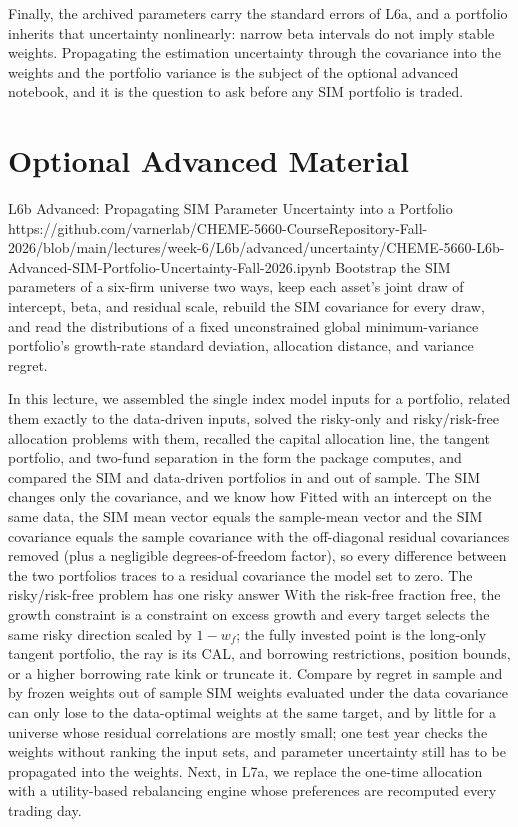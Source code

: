 \documentclass[11pt]{article}
\begin{document}
Finally, the archived parameters carry the standard errors of L6a, and a portfolio inherits that uncertainty nonlinearly: narrow beta intervals do not imply stable weights. Propagating the estimation uncertainty through the covariance into the weights and the portfolio variance is the subject of the optional advanced notebook, and it is the question to ask before any SIM portfolio is traded.

\section*{Optional Advanced Material}

\notebooklink
  {L6b Advanced: Propagating SIM Parameter Uncertainty into a Portfolio}
  {https://github.com/varnerlab/CHEME-5660-CourseRepository-Fall-2026/blob/main/lectures/week-6/L6b/advanced/uncertainty/CHEME-5660-L6b-Advanced-SIM-Portfolio-Uncertainty-Fall-2026.ipynb}
  {Bootstrap the SIM parameters of a six-firm universe two ways, keep each asset's joint draw of intercept, beta, and residual scale, rebuild the SIM covariance for every draw, and read the distributions of a fixed unconstrained global minimum-variance portfolio's growth-rate standard deviation, allocation distance, and variance regret.}

\newpage
\thispagestyle{fancy}
\keytakeaways
  {In this lecture, we assembled the single index model inputs for a portfolio, related them exactly to the data-driven inputs, solved the risky-only and risky/risk-free allocation problems with them, recalled the capital allocation line, the tangent portfolio, and two-fund separation in the form the package computes, and compared the SIM and data-driven portfolios in and out of sample.}
  {The SIM changes only the covariance, and we know how}
  {Fitted with an intercept on the same data, the SIM mean vector equals the sample-mean vector and the SIM covariance equals the sample covariance with the off-diagonal residual covariances removed (plus a negligible degrees-of-freedom factor), so every difference between the two portfolios traces to a residual covariance the model set to zero.}
  {The risky/risk-free problem has one risky answer}
  {With the risk-free fraction free, the growth constraint is a constraint on excess growth and every target selects the same risky direction scaled by $1-w_f$; the fully invested point is the long-only tangent portfolio, the ray is its CAL, and borrowing restrictions, position bounds, or a higher borrowing rate kink or truncate it.}
  {Compare by regret in sample and by frozen weights out of sample}
  {SIM weights evaluated under the data covariance can only lose to the data-optimal weights at the same target, and by little for a universe whose residual correlations are mostly small; one test year checks the weights without ranking the input sets, and parameter uncertainty still has to be propagated into the weights.}
  {Next, in L7a, we replace the one-time allocation with a utility-based rebalancing engine whose preferences are recomputed every trading day.}
\end{document}
